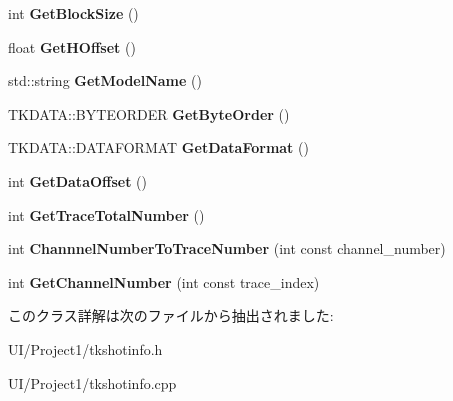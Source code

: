 \begin{DoxyCompactItemize}
\item 
\mbox{\label{class_t_k_d_a_t_a_a5fe237cba051e352845786e13c0cd54f}} 
int {\bfseries Get\+Block\+Size} ()
\item 
\mbox{\label{class_t_k_d_a_t_a_ac823854fcfb02d7788ec491b38f4d615}} 
float {\bfseries Get\+H\+Offset} ()
\item 
\mbox{\label{class_t_k_d_a_t_a_af0a676448ec4d492290517a7e60a2de3}} 
std\+::string {\bfseries Get\+Model\+Name} ()
\item 
\mbox{\label{class_t_k_d_a_t_a_a63437cd1b2448b0b54ee6ec56da1321e}} 
T\+K\+D\+A\+T\+A\+::\+B\+Y\+T\+E\+O\+R\+D\+ER {\bfseries Get\+Byte\+Order} ()
\item 
\mbox{\label{class_t_k_d_a_t_a_a86117b4edecbf2e3013973fb016877e2}} 
T\+K\+D\+A\+T\+A\+::\+D\+A\+T\+A\+F\+O\+R\+M\+AT {\bfseries Get\+Data\+Format} ()
\item 
\mbox{\label{class_t_k_d_a_t_a_a11fad512e15a5b8dd7be2ff786d5fd8e}} 
int {\bfseries Get\+Data\+Offset} ()
\item 
\mbox{\label{class_t_k_d_a_t_a_a0e9270376ed47917048fdd38f2f4a81d}} 
int {\bfseries Get\+Trace\+Total\+Number} ()
\item 
\mbox{\label{class_t_k_d_a_t_a_ad70108b9612759566d7cc90e60f293c5}} 
int {\bfseries Channnel\+Number\+To\+Trace\+Number} (int const channel\+\_\+number)
\item 
\mbox{\label{class_t_k_d_a_t_a_a8282e57fcee3618dfe533b6771adce96}} 
int {\bfseries Get\+Channel\+Number} (int const trace\+\_\+index)
\end{DoxyCompactItemize}


このクラス詳解は次のファイルから抽出されました\+:\begin{DoxyCompactItemize}
\item 
U\+I/\+Project1/tkshotinfo.\+h\item 
U\+I/\+Project1/tkshotinfo.\+cpp\end{DoxyCompactItemize}
